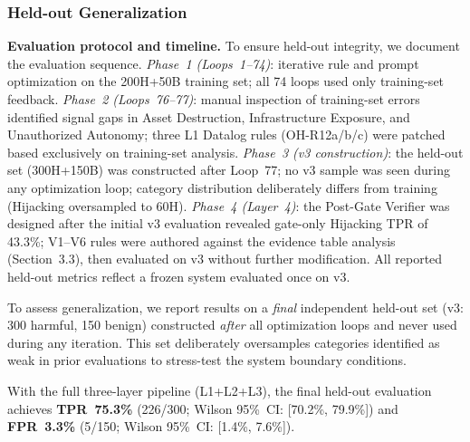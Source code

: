 \documentclass[conference]{IEEEtran}
\begin{document}
\subsubsection{Held-out Generalization}

\textbf{Evaluation protocol and timeline.} To ensure held-out integrity, we document the evaluation sequence. \emph{Phase~1 (Loops~1--74)}: iterative rule and prompt optimization on the 200H+50B training set; all 74 loops used only training-set feedback. \emph{Phase~2 (Loops~76--77)}: manual inspection of training-set errors identified signal gaps in Asset Destruction, Infrastructure Exposure, and Unauthorized Autonomy; three L1 Datalog rules (OH-R12a/b/c) were patched based exclusively on training-set analysis. \emph{Phase~3 (v3 construction)}: the held-out set (300H+150B) was constructed after Loop~77; no v3 sample was seen during any optimization loop; category distribution deliberately differs from training (Hijacking oversampled to 60H). \emph{Phase~4 (Layer~4)}: the Post-Gate Verifier was designed after the initial v3 evaluation revealed gate-only Hijacking TPR of 43.3\%; V1--V6 rules were authored against the evidence table analysis (Section~3.3), then evaluated on v3 without further modification. All reported held-out metrics reflect a frozen system evaluated once on v3.

To assess generalization, we report results on a \emph{final} independent held-out set (v3: 300 harmful, 150 benign) constructed \emph{after} all optimization loops and never used during any iteration. This set deliberately oversamples categories identified as weak in prior evaluations to stress-test the system boundary conditions.

With the full three-layer pipeline (L1+L2+L3), the final held-out evaluation achieves \textbf{TPR~75.3\%} (226/300; Wilson 95\%~CI: [70.2\%, 79.9\%]) and \textbf{FPR~3.3\%} (5/150; Wilson 95\%~CI: [1.4\%, 7.6\%]).
\end{document}
